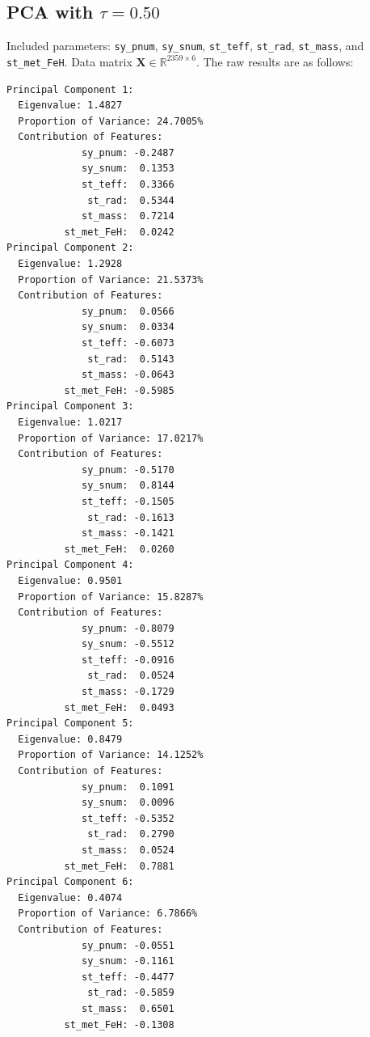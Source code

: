 \documentclass[preprint]{aastex631}
\begin{document}
\subsection[A.1]{PCA with $\tau = 0.50$}
Included parameters: \verb|sy_pnum|, \verb|sy_snum|, \verb|st_teff|, \verb|st_rad|, \verb|st_mass|, and \verb|st_met_FeH|. Data matrix $\mathbf{X} \in \mathbb{R}^{2359 \times 6}$. The raw results are as follows:
\begin{verbatim}
Principal Component 1:
  Eigenvalue: 1.4827
  Proportion of Variance: 24.7005%
  Contribution of Features:
             sy_pnum: -0.2487
             sy_snum:  0.1353
             st_teff:  0.3366
              st_rad:  0.5344
             st_mass:  0.7214
          st_met_FeH:  0.0242
Principal Component 2:
  Eigenvalue: 1.2928
  Proportion of Variance: 21.5373%
  Contribution of Features:
             sy_pnum:  0.0566
             sy_snum:  0.0334
             st_teff: -0.6073
              st_rad:  0.5143
             st_mass: -0.0643
          st_met_FeH: -0.5985
Principal Component 3:
  Eigenvalue: 1.0217
  Proportion of Variance: 17.0217%
  Contribution of Features:
             sy_pnum: -0.5170
             sy_snum:  0.8144
             st_teff: -0.1505
              st_rad: -0.1613
             st_mass: -0.1421
          st_met_FeH:  0.0260
Principal Component 4:
  Eigenvalue: 0.9501
  Proportion of Variance: 15.8287%
  Contribution of Features:
             sy_pnum: -0.8079
             sy_snum: -0.5512
             st_teff: -0.0916
              st_rad:  0.0524
             st_mass: -0.1729
          st_met_FeH:  0.0493
Principal Component 5:
  Eigenvalue: 0.8479
  Proportion of Variance: 14.1252%
  Contribution of Features:
             sy_pnum:  0.1091
             sy_snum:  0.0096
             st_teff: -0.5352
              st_rad:  0.2790
             st_mass:  0.0524
          st_met_FeH:  0.7881
Principal Component 6:
  Eigenvalue: 0.4074
  Proportion of Variance: 6.7866%
  Contribution of Features:
             sy_pnum: -0.0551
             sy_snum: -0.1161
             st_teff: -0.4477
              st_rad: -0.5859
             st_mass:  0.6501
          st_met_FeH: -0.1308
\end{verbatim}
\end{document}
